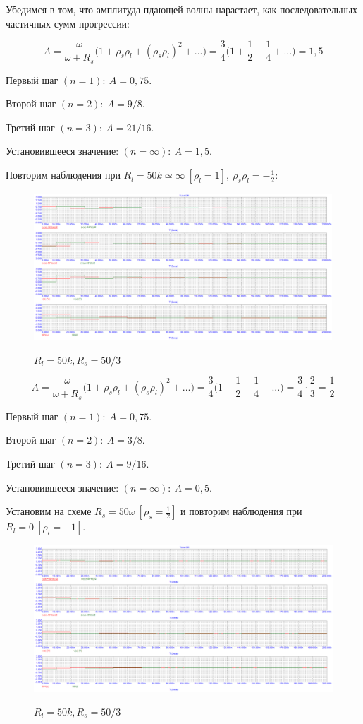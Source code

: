 \documentclass[a4paper, 12pt]{article}%
\begin{document}
Убедимся в том, что амплитуда пдающей волны нарастает, как последовательных частичных сумм прогрессии:

\[A = \frac{\omega}{\omega + R_s} \Big( 1 + \rho_s \rho_l + (\rho_s \rho_l)^2 + ...\Big) = \frac{3}{4} \Big( 1 + \frac{1}{2} + \frac{1}{4} + ... \Big) = 1,5\]

Первый шаг $(n = 1): \: A = 0,75$.

Второй шаг $(n = 2): \: A = 9/8$.

Третий шаг $(n = 3): \: A = 21/16$.

Установившееся значение: $(n = \infty): \: A = 1,5$.

Повторим наблюдения при $R_l = 50k \simeq \infty \: [\rho_l = 1], \: \rho_s \rho_l = -\frac{1}{2}$:

\begin{figure}[h!]
\centering
\includegraphics[scale=0.4]{images/Graph9.png}
\label{fig:Image1}
\caption{$R_l = 50k, R_s = 50/3$}
\end{figure}

\[A = \frac{\omega}{\omega + R_s} \Big( 1 + \rho_s \rho_l + (\rho_s \rho_l)^2 + ...\Big) = \frac{3}{4} \Big( 1 - \frac{1}{2} + \frac{1}{4} - ... \Big) = \frac{3}{4} \cdot \frac{2}{3} = \frac{1}{2}\]

Первый шаг $(n = 1): \: A = 0,75$.

Второй шаг $(n = 2): \: A = 3/8$.

Третий шаг $(n = 3): \: A = 9/16$.

Установившееся значение: $(n = \infty): \: A = 0,5$.

Установим на схеме $R_s = 50\omega \: [\rho_s = \frac{1}{2}]$ и повторим наблюдения при $R_l = 0 \:[\rho_l = -1]$.

\begin{figure}[h!]
\centering
\includegraphics[scale=0.4]{images/Graph10.png}
\label{fig:Image1}
\caption{$R_l = 50k, R_s = 50/3$}
\end{figure}
\end{document}
